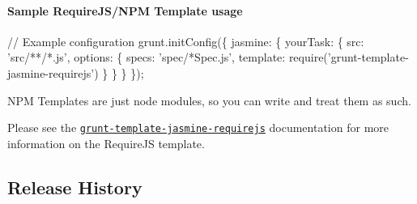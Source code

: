 \paragraph*{Sample Require\+J\+S/\+N\+P\+M Template usage}


\begin{DoxyCode}
\textcolor{comment}{// Example configuration}
grunt.initConfig(\{
  jasmine: \{
    yourTask: \{
      src: \textcolor{stringliteral}{'src/**/*.js'},
      options: \{
        specs: \textcolor{stringliteral}{'spec/*Spec.js'},
        \textcolor{keyword}{template}: require(\textcolor{stringliteral}{'grunt-template-jasmine-requirejs'})
      \}
    \}
  \}
\});
\end{DoxyCode}


N\+P\+M Templates are just node modules, so you can write and treat them as such.

Please see the \href{https://github.com/jsoverson/grunt-template-jasmine-requirejs}{\tt grunt-\/template-\/jasmine-\/requirejs} documentation for more information on the Require\+J\+S template.

\subsection*{Release History}


